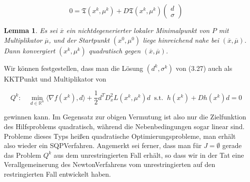 \documentclass[11pt]{scrreprt}
\newcounter{thm}
\theoremstyle{thmstyle}
\numberwithin{thm}{section}
\newtheorem{lemma}[thm]{Lemma}
\begin{document}
\begin{equation}
	0 = \mathfrak{T}(x^k, \mu^k) + D \mathfrak{T}(x^k, \mu^k) \begin{pmatrix} d \\ \sigma \end{pmatrix} \tag*{(3.27)}
\end{equation} 

\begin{lemma}
	Es sei $\overline{x}$ ein nichtdegenerierter lokaler Minimalpunkt von $P$ mit Multiplikator $\overline{\mu}$, und der Startpunkt $(x^0, \mu^0)$ liege hinreichend nahe bei $(\overline{x}, \overline{\mu})$. Dann konvergiert $(x^k, \mu^k)$ quadratisch gegen $(\overline{x}, \overline{\mu})$.
\end{lemma}

Wir können festgestellen, dass man die Lösung $(d^k, \sigma^k)$ von (3.27) auch als KKTPunkt und Multiplikator von

	$$ Q^k \colon \quad \min_{d \in \mathbb{R}^n} \langle \nabla f(x^k), d \rangle + \frac{1}{2} d^T D_x^2 L(x^k, \mu^k) d ~\text{ s.t. }~ h(x^k) + D h(x^k) d = 0 $$

gewinnen kann. Im Gegensatz zur obigen Vermutung ist also nur die Zielfunktion des Hilfsproblems quadratisch, während die Nebenbedingungen sogar linear sind. Probleme dieses Typs heißen quadratische Optimierungsprobleme, man erhält also wieder ein SQPVerfahren. Angemerkt sei ferner, dass man für $J = \emptyset$ gerade das Problem $Q^k$ aus dem unrestringierten Fall erhält, so dass wir in der Tat eine Verallgemeinerung des NewtonVerfahrens vom unrestringierten auf den restringierten Fall entwickelt haben.
\end{document}
